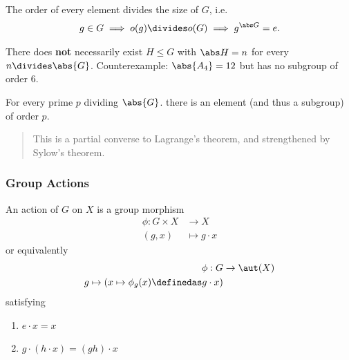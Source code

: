 \begin{corollary}

The order of every element divides the size of \(G\), i.e.
\begin{align*}
  g\in G \implies o(g) \divides o(G) \implies g^{\abs G} = e
  .\end{align*}

\end{corollary}

\begin{warning}

There does \textbf{not} necessarily exist \(H \leq G\) with
\(\abs H = n\) for every \(n \divides \abs{G}\). Counterexample:
\(\abs{A_4} = 12\) but has no subgroup of order 6.

\end{warning}

\begin{theorem}

For every prime \(p\) dividing \(\abs{G}\). there is an element (and
thus a subgroup) of order \(p\).

\end{theorem}

\begin{quote}
This is a partial converse to Lagrange's theorem, and strengthened by
Sylow's theorem.
\end{quote}

\hypertarget{group-actions}{%
\subsubsection{Group Actions}\label{group-actions}}

\begin{definition}

An action of \(G\) on \(X\) is a group morphism \begin{align*}
\phi:G \times X &\rightarrow X \\ 
(g,x) &\mapsto g\cdot x
\end{align*} or equivalently \begin{align*}
\phi: G &\to \aut(X) \\
g \mapsto (x \mapsto \phi_g(x) \definedas g\cdot x)
\end{align*} satisfying

\begin{enumerate}
\def\labelenumi{\arabic{enumi}.}
\tightlist
\item
  \(e\cdot x = x\)
\item
  \(g\cdot (h\cdot x) = (gh)\cdot x\)
\end{enumerate}

\end{definition}

